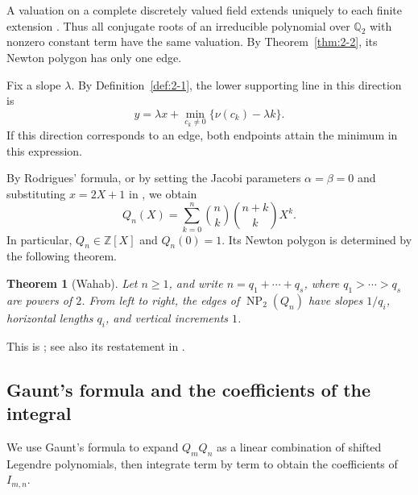 \documentclass[11pt,a4paper]{article}
\numberwithin{equation}{section}
\newtheorem{theorem}{Theorem}[section]
\theoremstyle{definition}
\begin{document}
A valuation on a complete discretely valued field extends uniquely to
each finite extension \cite[Theorem~7.38 and Corollary~7.40,
pp.~123--124]{Milne}. Thus all conjugate roots of an irreducible
polynomial over $\mathbb{Q}_2$ with nonzero constant term have the same
valuation. By Theorem~\ref{thm:2-2}, its Newton polygon has only one edge.

Fix a slope $\lambda$. By Definition~\ref{def:2-1}, the lower supporting
line in this direction is
\begin{equation}
 y=\lambda x+\min_{c_k\ne0}\{\nu(c_k)-\lambda k\}.
 \label{eq:2-9}
\end{equation}
If this direction corresponds to an edge, both endpoints attain the
minimum in this expression.

By Rodrigues' formula, or by setting the Jacobi parameters
$\alpha=\beta=0$ and substituting $x=2X+1$ in
\cite[Eq.~(18.5.7)]{DLMF}, we obtain
\begin{equation}
 Q_n(X)=\sum_{k=0}^n\binom{n}{k}\binom{n+k}{k}X^k.
 \label{eq:2-10}
\end{equation}
In particular, $Q_n\in\mathbb{Z}[X]$ and $Q_n(0)=1$. Its Newton polygon
is determined by the following theorem.

\begin{theorem}[Wahab]\label{thm:2-4}
Let $n\ge1$, and write $n=q_1+\cdots+q_s$, where
$q_1>\cdots>q_s$ are powers of $2$. From left to right, the edges of
$\operatorname{NP}_2(Q_n)$ have slopes $1/q_i$, horizontal lengths
$q_i$, and vertical increments $1$.
\end{theorem}

This is \cite[Theorem~3.1]{Wahab}; see also its restatement in
\cite[Theorem~7.3]{CullinanHajir}.

\subsection{Gaunt's formula and the coefficients of the integral}

We use Gaunt's formula to expand $Q_mQ_n$ as a linear combination of
shifted Legendre polynomials, then integrate term by term to obtain
the coefficients of $I_{m,n}$.
\end{document}
